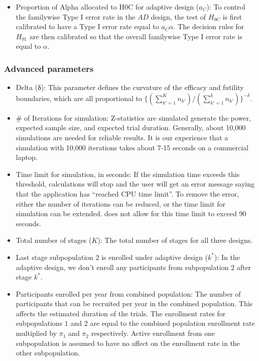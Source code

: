 \documentclass[article]{jss}
\begin{document}
\begin{itemize}
\item Proportion of Alpha allocated to H0C for adaptive design ($a_C$): To control the familywise Type I error rate in the $AD$ design, the test of $H_{0C}$ is first calibrated to have a Type I error rate equal to $a_Cα$. The decision rules for $H_{01}$ are then calibrated so that the overall familywise Type I error rate is equal to $α$.


\end{itemize}

\subsubsection{Advanced parameters}
\label{sub:advanced-parameters}

\begin{itemize}

\item Delta (δ): This parameter defines the curvature of the efficacy and futility boundaries, which are all proportional to $\{(\sum_{k'=1}^{K} n_{k'})/(\sum_{k'=1}^{k}n_{k'})\}^{-δ}$. %

\item \# of Iterations for simulation: Z-statistics are simulated generate the power, expected sample size, and expected trial duration. Generally, about 10,000 simulations are needed for reliable results. It is our experience that a simulation with 10,000 iterations takes about 7-15 seconds on a commercial laptop.

\item Time limit for simulation, in seconds: If the simulation time exceeds this threshold, calculations will stop and the user will get an error message saying that the application has “reached CPU time limit”. To remove the error, either the number of iterations can be reduced, or the time limit for simulation can be extended.  does not allow for this time limit to exceed 90 seconds.

\item Total number of stages ($K$): The total number of stages for all three designs. 

\item Last stage subpopulation $2$ is enrolled under adaptive design ($k^*$): In the adaptive design, we don’t enroll any participants from subpopulation $2$ after stage $k^*$. 

\item Participants enrolled per year from combined population: The number of participants that can be recruited per year in the combined population. This affects the estimated duration of the trials. The enrollment rates for  subpopulations $1$ and $2$ are equal to the combined population enrollment rate multiplied by $π_1$ and $π_2$ respectively. Active enrollment from one subpopulation is assumed to have no affect on the enrollment rate in the other subpopulation. %



\end{itemize}
\end{document}
